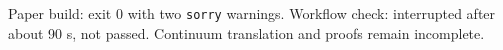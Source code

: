{\scriptsize Paper build: exit 0 with two \texttt{sorry} warnings. Workflow check: interrupted after about 90 s, not passed. Continuum translation and proofs remain incomplete.}
